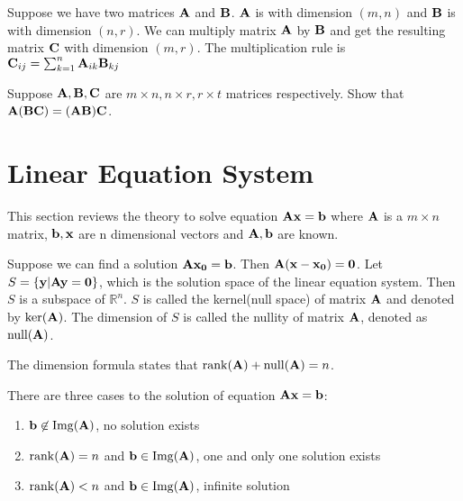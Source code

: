 Suppose we have two matrices $\mathbf{A}$ and $\mathbf{B}$.  $\mathbf{A}$ is with dimension $(m,n)$ and $\mathbf{B}$ is with dimension $(n,r)$. We can multiply matrix $\mathbf{A}$ by $\mathbf{B}$ and get the resulting matrix $\mathbf{C}$ with dimension $(m, r)$. The multiplication rule is $\mathbf{C}_{ij} = \sum_{k=1}^n \mathbf{A}_{ik}\mathbf{B}_{kj}$

\begin{exercise}
Suppose $\mathbf{A}, \mathbf{B}, \mathbf{C}$ are $m\times n, n\times r, r \times t$ matrices respectively.	Show that $\mathbf{A}(\mathbf{B}\mathbf{C}) = (\mathbf{A}\mathbf{B})\mathbf{C}$.
\end{exercise}


\section{Linear Equation System}
This section reviews the theory to solve equation $\mathbf{A}\mathbf{x}=\mathbf{b}$ where $\mathbf{A}$ is a $m \times n$ matrix, $\mathbf{b}, \mathbf{x}$ are n dimensional vectors and $\mathbf{A}, \mathbf{b}$ are known.

Suppose we can find a solution $\mathbf{A}\mathbf{x_0} = \mathbf{b}$. Then $\mathbf{A}(\mathbf{x}-\mathbf{x_0})=\mathbf{0}$. Let $S = \{\mathbf{y} | \mathbf{A}\mathbf{y}=\mathbf{0}\}$, which is the solution space of the linear equation system. Then $S$ is a subspace of $\mathbb{R}^n$. $S$ is called the kernel(null space) of matrix $\mathbf{A}$ and denoted by $\mathrm{ker}(\mathbf{A})$. The dimension of $S$ is called the nullity of matrix $\mathbf{A}$, denoted as $\mathrm{null}(\mathbf{A})$.

The dimension formula states that $\mathrm{rank}(\mathbf{A}) + \mathrm{null}(\mathbf{A}) = n$.

There are three cases to the solution of equation $\mathbf{A}\mathbf{x}=\mathbf{b}$:
\begin{enumerate}
\item $\mathbf{b} \not\in \mathrm{Img}(\mathbf{A})$, no solution exists
\item $\mathrm{rank}(\mathbf{A}) = n$ and $\mathbf{b} \in \mathrm{Img}(\mathbf{A})$, one and only one solution exists
\item $\mathrm{rank}(\mathbf{A}) < n$ and $\mathbf{b} \in \mathrm{Img}(\mathbf{A})$, infinite solution
\end{enumerate}
